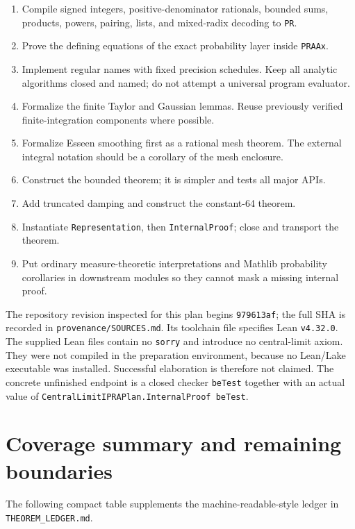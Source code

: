 \documentclass[11pt]{article}
\newcommand{\code}[1]{\nolinkurl{#1}}
\begin{document}
\begin{enumerate}
\item Compile signed integers, positive-denominator rationals, bounded sums,
products, powers, pairing, lists, and mixed-radix decoding to \code{PR}.
\item Prove the defining equations of the exact probability layer inside
\code{PRAAx}.
\item Implement regular names with fixed precision schedules.  Keep all
analytic algorithms closed and named; do not attempt a universal program
evaluator.
\item Formalize the finite Taylor and Gaussian lemmas.  Reuse previously
verified finite-integration components where possible.
\item Formalize Esseen smoothing first as a rational mesh theorem.  The
external integral notation should be a corollary of the mesh enclosure.
\item Construct the bounded theorem; it is simpler and tests all major APIs.
\item Add truncated damping and construct the constant-64 theorem.
\item Instantiate \code{Representation}, then \code{InternalProof}; close and
transport the theorem.
\item Put ordinary measure-theoretic interpretations and Mathlib probability
corollaries in downstream modules so they cannot mask a missing internal
proof.
\end{enumerate}

The repository revision inspected for this plan begins
\code{979613af}; the full SHA is recorded in \code{provenance/SOURCES.md}.
Its toolchain file specifies Lean \code{v4.32.0}.  The supplied Lean files contain no \code{sorry} and
introduce no central-limit axiom.  They were not compiled in the preparation
environment, because no Lean/Lake executable was installed.  Successful
elaboration is therefore not claimed.  The concrete unfinished endpoint is a
closed checker \code{beTest} together with an actual value of
\code{CentralLimitIPRAPlan.InternalProof beTest}.

\section{Coverage summary and remaining boundaries}
\label{sec:coverage}

The following compact table supplements the machine-readable-style ledger in
\code{THEOREM_LEDGER.md}.
\end{document}
